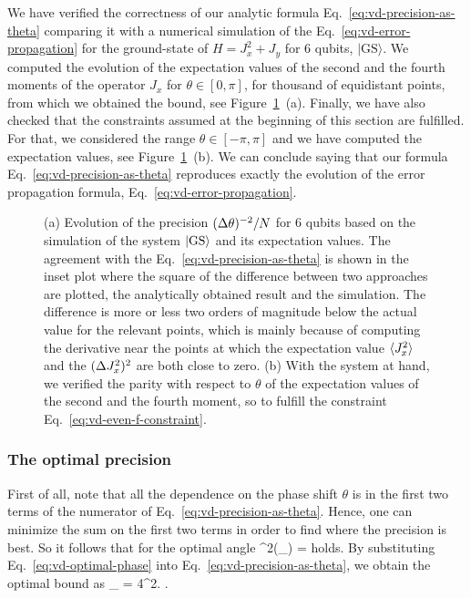 We have verified the correctness of our analytic formula Eq.~\eqref{eq:vd-precision-as-theta} comparing it with a numerical simulation of the Eq.~\eqref{eq:vd-error-propagation} for the ground-state of $H=J_x^2+J_y$ for 6 qubits, $|\text{GS}\rangle$.
We computed the evolution of the expectation values of the second and the fourth moments of the operator $J_x$ for $\theta \in [0,\pi]$, for thousand of equidistant points, from which we obtained the bound, see Figure~\ref{fig:vd-evolution-of-precision}~(a).
Finally, we have also checked that the constraints assumed at the beginning of this section are fulfilled.
For that, we considered the range $\theta \in [-\pi,\pi]$ and we have computed the expectation values, see Figure~\ref{fig:vd-evolution-of-precision}~(b).
We can conclude saying that our formula Eq.~\eqref{eq:vd-precision-as-theta} reproduces exactly the evolution of the error propagation formula, Eq.~\eqref{eq:vd-error-propagation}.
\begin{figure}[htp]
  \centering
  \caption[(a) Evolution of $\varinv{\theta}/N$. (b) Evolution of the expectation values]{(a) Evolution of the precision $\varinv{\theta}/N$ for 6 qubits based on the simulation of the system $\vert{\text{GS}}\rangle$ and its expectation values.
  The agreement with the Eq.~\eqref{eq:vd-precision-as-theta} is shown in the inset plot where the square of the difference between two approaches are plotted, the analytically obtained result and the simulation.
  The difference is more or less two orders of magnitude below the actual value for the relevant points, which is mainly because of computing the derivative near the points at which the expectation value $\langle{J_x^2}\rangle$ and the $(\Delta J_x^2 )^2$ are both close to zero.
  (b) With the system at hand, we verified the parity with respect to $\theta$ of the expectation values of the second and the fourth moment, so to fulfill the constraint Eq.~\eqref{eq:vd-even-f-constraint}.}
  \label{fig:vd-evolution-of-precision}
\end{figure}

\subsubsection{The optimal precision}
First of all, note that all the dependence on the phase shift $\theta$ is in the first two terms of the numerator of Eq.~\eqref{eq:vd-precision-as-theta}.
Hence, one can minimize the sum on the first two terms in order to find where the precision is best.
So it follows that for the optimal angle
\be
  \label{eq:vd-optimal-phase}
  \tan^2(\theta_{}) = 
\ee
holds.
By substituting Eq.~\eqref{eq:vd-optimal-phase} into Eq.~\eqref{eq:vd-precision-as-theta}, we obtain the optimal bound as
\be
  \varian{\theta}_{} = 
  {4^2}.
  \label{eq:vd-precision}
\ee.

